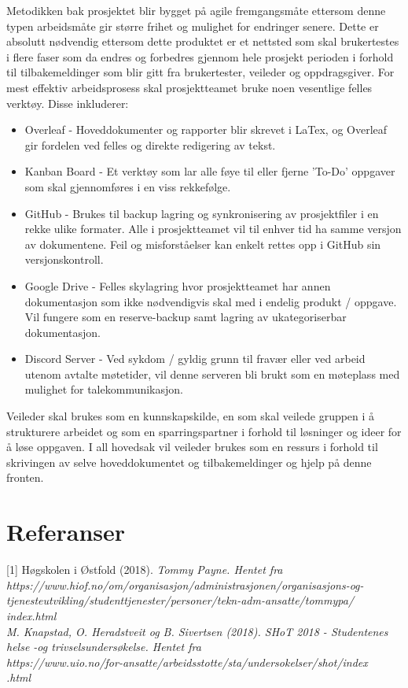 \documentclass[11pt,a4paper]{report}
\begin{document}
Metodikken bak prosjektet blir bygget på agile fremgangsmåte ettersom denne typen arbeidsmåte gir større frihet og mulighet for endringer senere. Dette er absolutt nødvendig ettersom dette produktet er et nettsted som skal brukertestes i flere faser som da endres og forbedres gjennom hele prosjekt perioden i forhold til tilbakemeldinger som blir gitt fra brukertester, veileder og oppdragsgiver. 
\newpage
For mest effektiv arbeidsprosess skal prosjektteamet bruke noen vesentlige felles verktøy.
Disse inkluderer:
\begin{itemize}
\item Overleaf - Hoveddokumenter og rapporter blir skrevet i LaTex, og Overleaf gir fordelen ved felles og direkte redigering av tekst. 
\item Kanban Board - Et verktøy som lar alle føye til eller fjerne 'To-Do' oppgaver som skal gjennomføres i en viss rekkefølge.
\item GitHub - Brukes til backup lagring og synkronisering av prosjektfiler i en rekke ulike formater. Alle i prosjektteamet vil til enhver tid ha samme versjon av dokumentene. Feil og misforståelser kan enkelt rettes opp i GitHub sin versjonskontroll.
\item Google Drive - Felles skylagring hvor prosjektteamet har annen dokumentasjon som ikke nødvendigvis skal med i endelig produkt / oppgave. Vil fungere som en reserve-backup samt lagring av ukategoriserbar dokumentasjon.
\item Discord Server - Ved sykdom / gyldig grunn til fravær eller ved arbeid utenom avtalte møtetider, vil denne serveren bli brukt som en møteplass med mulighet for talekommunikasjon.
\end{itemize}


Veileder skal brukes som en kunnskapskilde, en som skal veilede gruppen i å strukturere arbeidet og som en sparringspartner i forhold til løsninger og ideer for å løse oppgaven. I all hovedsak vil veileder brukes som en ressurs i forhold til skrivingen av selve hoveddokumentet og tilbakemeldinger og hjelp på denne fronten.

\section*{Referanser}

[1] Høgskolen i Østfold (2018). \em Tommy Payne. \em Hentet fra \\
https://www.hiof.no/om/organisasjon/administrasjonen/organisasjons-og-\\tjenesteutvikling/studenttjenester/personer/tekn-adm-ansatte/tommypa/\\index.html \\
\noindent
[2]	M. Knapstad, O. Heradstveit og B. Sivertsen (2018). \em SHoT 2018 - Studentenes helse -og trivselsundersøkelse. \em Hentet fra \\
https://www.uio.no/for-ansatte/arbeidsstotte/sta/undersokelser/shot/index\\.html
\end{document}
